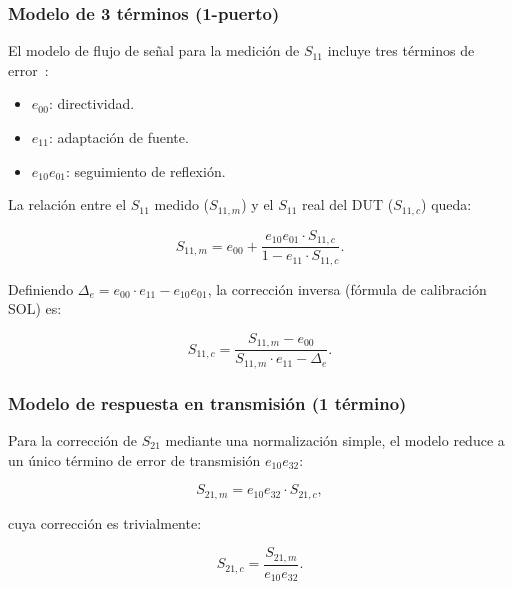 \subsubsection{Modelo de 3 términos (1-puerto)}

El modelo de flujo de señal para la medición de $S_{11}$ incluye tres términos
de error~\cite{pozar2012, agilent2002}:

\begin{itemize}
    \item $e_{00}$: directividad.
    \item $e_{11}$: adaptación de fuente.
    \item $e_{10}e_{01}$: seguimiento de reflexión.
\end{itemize}

La relación entre el $S_{11}$ medido ($S_{11,m}$) y el $S_{11}$ real del DUT
($S_{11,c}$) queda:

\begin{equation}
    S_{11,m} = e_{00} + \frac{e_{10}e_{01}\cdot S_{11,c}}{1 - e_{11}\cdot S_{11,c}}.
    \label{eq:s11_medido}
\end{equation}

Definiendo $\Delta_e = e_{00}\cdot e_{11} - e_{10}e_{01}$, la corrección
inversa (fórmula de calibración SOL) es:

\begin{equation}
    \boxed{
    S_{11,c} = \frac{S_{11,m} - e_{00}}{S_{11,m}\cdot e_{11} - \Delta_e}.
    }
    \label{eq:correccion_s11}
\end{equation}

\subsubsection{Modelo de respuesta en transmisión (1 término)}

Para la corrección de $S_{21}$ mediante una normalización simple, el modelo
reduce a un único término de error de transmisión $e_{10}e_{32}$:

\begin{equation}
    S_{21,m} = e_{10}e_{32}\cdot S_{21,c},
    \label{eq:s21_medido}
\end{equation}

cuya corrección es trivialmente:

\begin{equation}
    \boxed{
    S_{21,c} = \frac{S_{21,m}}{e_{10}e_{32}}.
    }
    \label{eq:correccion_s21_simple}
\end{equation}

